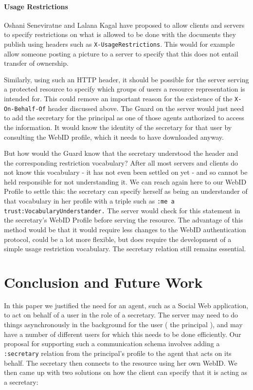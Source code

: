 \documentclass[a4paper]{llncs}
\begin{document}
\paragraph{Usage Restrictions}

Oshani Seneviratne and Lalana Kagal have proposed\cite{DBLP:conf/policy/SeneviratneK11} to allow clients and servers to specify restrictions on what is allowed to be done with the documents they publish using headers such as \lstinline|X-UsageRestrictions|. 
This would for example allow someone posting a picture to a server to specify that this does not entail transfer of ownership. 

Similarly, using such an HTTP header, it should be possible for the server serving a protected resource to specify which groups of users a resource representation is intended for.
This could remove an important reason for the existence of the \lstinline|X-On-Behalf-Of| header discussed above.
The Guard on the server would just need to add the secretary for the principal as one of those agents authorized to access the information.
It would know the identity of the secretary for that user by consulting the WebID profile, which it needs to have downloaded anyway.

But how would the Guard know that the secretary understood the header and the corresponding restriction vocabulary? 
After all most servers and clients do not know this vocabulary - it has not even been settled on yet - and so cannot be held responsible for not understanding it.
We can reach again here to our WebID Profile to settle this: the secretary can specify herself as being an understander of that vocabulary in her profile with a triple such as \lstinline|:me a trust:VocabularyUnderstander.|
The server would check for this statement in the secretary's WebID Profile before serving the resource.
The advantage of this method would be that it would require less changes to the WebID authentication protocol, could be a lot more flexible, but does require the development of a simple usage restriction vocabulary.
The secretary relation still remains essential.

\section{Conclusion and Future Work}\label{sec:conclusion}

In this paper we justified the need for an agent, such as a Social Web application, to act on behalf of a user in the role of a secretary.
The server may need to do things asynchronously in the background for the user ( the principal ), and may have a number of different users for which this needs to be done efficiently.
Our proposal for supporting such a communication schema involves adding a \lstinline|:secretary| relation from the principal's profile to the agent that acts on its behalf. 
The secretary then connects to the resource using her own WebID.
We then came up with two solutions on how the client can specify that it is acting as a secretary:
\end{document}

